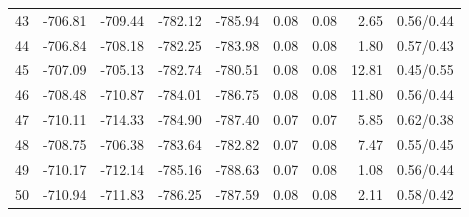 \begin{tabular}{lrrrrrrrr}
43 & -706.81 & -709.44 & -782.12 & -785.94 & 0.08 & 0.08 & 2.65 & 0.56/0.44 \\
44 & -706.84 & -708.18 & -782.25 & -783.98 & 0.08 & 0.08 & 1.80 & 0.57/0.43 \\
45 & -707.09 & -705.13 & -782.74 & -780.51 & 0.08 & 0.08 & 12.81 & 0.45/0.55 \\
46 & -708.48 & -710.87 & -784.01 & -786.75 & 0.08 & 0.08 & 11.80 & 0.56/0.44 \\
47 & -710.11 & -714.33 & -784.90 & -787.40 & 0.07 & 0.07 & 5.85 & 0.62/0.38 \\
48 & -708.75 & -706.38 & -783.64 & -782.82 & 0.07 & 0.08 & 7.47 & 0.55/0.45 \\
49 & -710.17 & -712.14 & -785.16 & -788.63 & 0.07 & 0.08 & 1.08 & 0.56/0.44 \\
50 & -710.94 & -711.83 & -786.25 & -787.59 & 0.08 & 0.08 & 2.11 & 0.58/0.42 \\
\hline
\end{tabular}
